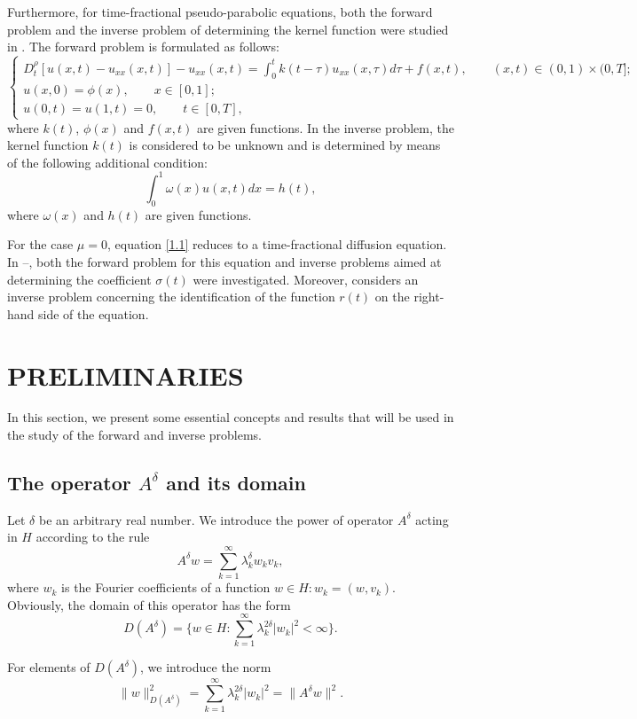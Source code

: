 \documentclass[reqno]{amsart}
\theoremstyle{definition}
\numberwithin{equation}{section}
\begin{document}
Furthermore, for time-fractional pseudo-parabolic equations, both the forward problem and the inverse problem of determining the kernel function were studied in \cite{Durdiev_Elmuradova}. The forward problem is formulated as follows:
$$
\begin{cases}
 D_t^\rho [u(x, t)- u_{x x}(x, t)]-u_{x x}(x, t)=\int_0^t k(t-\tau) u_{x x}(x, \tau) d \tau+f(x, t), \qquad (x,t) \in (0,1) \times (0,T];\\ 
u(x, 0)=\phi(x),   \qquad x \in [0,1];\\
u(0, t)=u(1, t)=0, \qquad t \in [0,T],
\end{cases}
$$
where $k(t)$, $\phi(x)$ and $f(x,t)$ are given functions. In the inverse problem, the kernel function $k(t)$ is considered to be unknown and is determined by means of the following additional condition:
$$
\int_0^1 \omega(x) u(x, t) d x=h(t),
$$
where $\omega(x)$ and $h(t)$ are given functions. 

For the case $\mu = 0$, equation \eqref{1.1} reduces to a time-fractional diffusion equation. In \cite{Zhang}–\cite{SerikbaevRuzhanskyTokmagambetov}, both the forward problem for this equation and inverse problems aimed at determining the coefficient $\sigma(t)$ were investigated. Moreover, \cite{SerikbaevRuzhanskyTokmagambetov2} considers an inverse problem concerning the identification of the function $r(t)$ on the right-hand side of the equation.

\section{PRELIMINARIES} 
In this section, we present some essential concepts and results that will be used in the study of the forward and inverse problems.

\subsection{The operator $A^{\delta}$ and its domain} 

Let $\delta$ be an arbitrary real number. We introduce the power of operator $A^{\delta}$ acting in $H$ according to the rule 
$$
A^{\delta}w = \sum_{k=1}^{\infty} \lambda_k^{\delta}  w_k v_k,
$$
where $w_k$ is the Fourier coefficients of a function $w \in H : w_k = (w,v_k)$. Obviously, the domain of
this operator has the form
$$
D(A^{\delta}) = \{w \in H: \sum_{k=1}^{\infty} \lambda_k^{2\delta}  |w_k|^2 < \infty  \}.
$$

For elements of $D(A^{\delta})$, we introduce the norm 
$$
\| w \|^2_{D(A^{\delta})} = \sum_{k=1}^{\infty} \lambda_k^{2\delta}  |w_k|^2 =  \| A^{\delta}w \|^2.
$$
\end{document}
